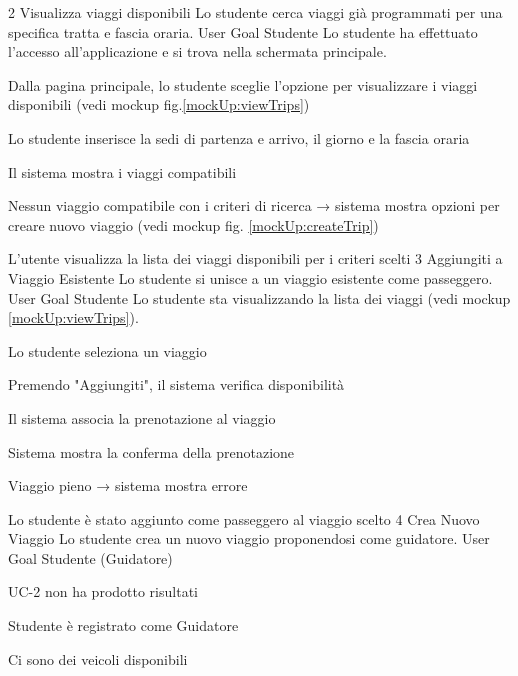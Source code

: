 \UseCase
{2}
{Visualizza viaggi disponibili}
{Lo studente cerca viaggi già programmati per una specifica tratta e fascia oraria.}
{User Goal}
{Studente}
{Lo studente ha effettuato l’accesso all’applicazione e si trova nella schermata principale.}
{\begin{description}[nosep]
    \item[1.] Dalla pagina principale, lo studente sceglie l'opzione per visualizzare i viaggi disponibili (vedi mockup fig.\ref{mockUp:viewTrips})
    \item[2.] Lo studente inserisce la sedi di partenza e arrivo, il giorno e la fascia oraria
    \item[3.] Il sistema mostra i viaggi compatibili
\end{description}}
{\begin{description}[nosep]
    \item[3a.] Nessun viaggio compatibile con i criteri di ricerca → sistema mostra opzioni per creare nuovo viaggio (vedi mockup fig. \ref{mockUp:createTrip})
\end{description}}
{L'utente visualizza la lista dei viaggi disponibili per i criteri scelti} 
\UseCase
{3}
{Aggiungiti a Viaggio Esistente}
{Lo studente si unisce a un viaggio esistente come passeggero.}
{User Goal}
{Studente}
{Lo studente sta visualizzando la lista dei viaggi (vedi mockup \ref{mockUp:viewTrips}).}
{\begin{description}[nosep]
    \item[1.] Lo studente seleziona un viaggio
    \item[2.] Premendo "Aggiungiti", il sistema verifica disponibilità
    \item[3.] Il sistema associa la prenotazione al viaggio
    \item[4.] Sistema mostra la conferma della prenotazione
\end{description}}
{\begin{description}[nosep]
    \item[2a.] Viaggio pieno → sistema mostra errore
\end{description}}
{Lo studente è stato aggiunto come passeggero al viaggio scelto}
\label{uc:uc3}
\UseCase
{4}
{Crea Nuovo Viaggio}
{Lo studente crea un nuovo viaggio proponendosi come guidatore.}
{User Goal}
{Studente (Guidatore)}
{\begin{description}[nosep]
    \item[-] UC-2 non ha prodotto risultati
    \item[-] Studente è registrato come Guidatore
    \item[-] Ci sono dei veicoli disponibili
\end{description}}
